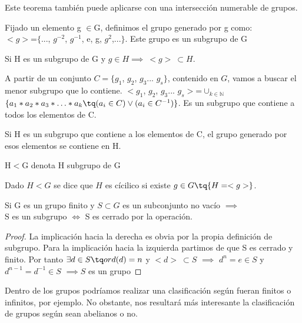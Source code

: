 \documentclass[a4paper,10pt]{apuntes}
\newenvironment{notacion}[1][Notación:]{\begin{trivlist}
\item[\hskip \labelsep {\bfseries #1}]}{\end{trivlist}}
\begin{document}
  Este teorema también puede aplicarse con una intersección numerable de grupos.
  
  \begin{defn}
   Fijado un elemento g $\in$G, definimos el grupo generado por g como:\\
   $<g>$=$\{$..., $g^{-2}$, $g^{-1}$, e, g, $g^{2}$,...$\}$. Este grupo es un subgrupo de G
  \end{defn}

  \begin{theorem}
   Si H es un subgrupo de G y $g\in H  \implies \ <g>\ \subset H$.   
  \end{theorem}

  A partir de un conjunto $C=\{g_{1}$, $g_{2}$, $g_{3}$... $g_{s}\}$, contenido en $G$, vamos a buscar el menor subgrupo que lo contiene.
  $<g_{1}$, $g_{2}$, $g_{3}$... $g_{s}>$=$\displaystyle \cup_{k\in\mathds{N}}$  $\{ a_{1}\ast a_{2}\ast a_{3}\ast \hdots \ast a_{k} \tq (a_{i}\in C) \vee ( a_{i}\in C^{-1} ) \}$. Es un subgrupo que contiene a 
  todos los elementos de C.
  
  Si H es un subgrupo que contiene a los elementos de C, el grupo generado por esos elementos se contiene en H.
  
  \begin{notacion}
   H$<$G denota H subgrupo de G
  \end{notacion}
  \begin{defn}
   Dado $H<G$ se dice que $H$ es cícilico si existe $g\in G\tq \{ H=<g>\} $. 
  \end{defn}

  \begin{theorem}
   Si G es un grupo finito y $S \subset G$ es un subconjunto no vacío $\implies$ \\S es un subgrupo $\iff$ S es cerrado por la operación.   
  \end{theorem}
  \begin{proof}
   La implicación hacia la derecha es obvia por la propia definición de subgrupo.
   Para la implicación hacia la izquierda partimos de que S es cerrado y finito. Por tanto $\exists d \in S \tq ord(d)=n$ y $<d>\ \subset S$
   $\implies$ $d^{n}=e\in S$ y $d^{n-1}=d^{-1}\in S$ $\implies S$ es un grupo
  \end{proof}

  Dentro de los grupos podríamos realizar una clasificación según fueran finitos o infinitos, por ejemplo. No obstante, nos resultará
  más interesante la clasificación de grupos según sean abelianos o no.
  
\end{document}
